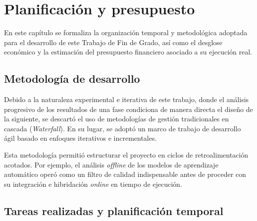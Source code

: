 \chapter{Planificación y presupuesto}
\label{chap:planificacion}

En este capítulo se formaliza la organización temporal y metodológica adoptada para el desarrollo de este Trabajo de Fin de Grado, así como el desglose económico y la estimación del presupuesto financiero asociado a su ejecución real.



\section{Metodología de desarrollo}
\label{sec:metodologia}

Debido a la naturaleza experimental e iterativa de este trabajo, donde el análisis progresivo de los resultados de una fase condiciona de manera directa el diseño de la siguiente, se descartó el uso de metodologías de gestión tradicionales en cascada (\textit{Waterfall}). En su lugar, se adoptó un marco de trabajo de desarrollo ágil basado en enfoques iterativos e incrementales.

Esta metodología permitió estructurar el proyecto en ciclos de retroalimentación acotados. Por ejemplo, el análisis \textit{offline} de los modelos de aprendizaje automático operó como un filtro de calidad indispensable antes de proceder con su integración e hibridación \textit{online} en tiempo de ejecución.

\section{Tareas realizadas y planificación temporal}
\label{sec:tareas_planificacion}

